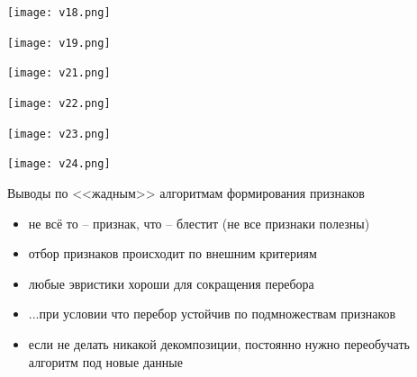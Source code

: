 \documentclass[pdf, intlimits, 9pt, unicode]{beamer}
\begin{document}
\begin{frame}\begin{center}\texttt{[image: v18.png]}\end{center}\end{frame}
\begin{frame}\begin{center}\texttt{[image: v19.png]}\end{center}\end{frame}
\begin{frame}\begin{center}\texttt{[image: v21.png]}\end{center}\end{frame}
\begin{frame}\begin{center}\texttt{[image: v22.png]}\end{center}\end{frame}
\begin{frame}\begin{center}\texttt{[image: v23.png]}\end{center}\end{frame}
\begin{frame}\begin{center}\texttt{[image: v24.png]}\end{center}\end{frame}



\begin{frame}{Выводы по <<жадным>> алгоритмам формирования признаков}
\begin{itemize}
\item не всё то -- признак, что -- блестит (не все признаки полезны)\pause
\item отбор признаков происходит по внешним критериям\pause
\item любые эвристики хороши для сокращения перебора\pause
\item ...при условии что перебор устойчив по подмножествам признаков\pause
\item если не делать никакой декомпозиции, {\color{red}постоянно нужно переобучать алгоритм под новые данные}
\end{itemize}
\end{frame}



\end{document}
